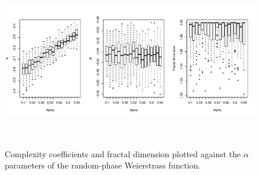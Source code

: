 \begin{figure}[!htbp]
  \begin{center}
  \includegraphics[height = 3in, width =6in, keepaspectratio]{./figs/holder_coeffs-boxplots.pdf}
   
  \caption{Complexity coefficients and fractal dimension 
  plotted against the $\alpha$ parameters of the 
  random-phase Weierstrass function.  }
    \label{fig:rp-weierstrass-boxplot}
  \end{center}
\end{figure}

